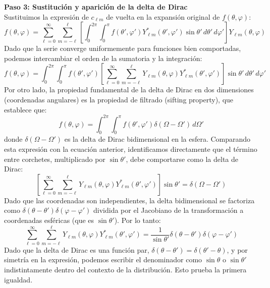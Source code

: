 \documentclass[a4paper]{article}
\begin{document}
\vspace{0.3cm}
\noindent\textbf{Paso 3: Sustitución y aparición de la delta de Dirac} \\
Sustituimos la expresión de $c_{\ell m}$ de vuelta en la expansión original de $f(\theta, \varphi)$:
$$
f(\theta, \varphi) = \sum_{\ell=0}^{\infty} \sum_{m=-\ell}^{\ell} \left[ \int_{0}^{2\pi} \int_{0}^{\pi} f(\theta', \varphi') Y_{\ell m}^*(\theta', \varphi') \sin\theta' \, d\theta' \, d\varphi' \right] Y_{\ell m}(\theta, \varphi)
$$
Dado que la serie converge uniformemente para funciones bien comportadas, podemos intercambiar el orden de la sumatoria y la integración:
$$
f(\theta, \varphi) = \int_{0}^{2\pi} \int_{0}^{\pi} f(\theta', \varphi') \left[ \sum_{\ell=0}^{\infty} \sum_{m=-\ell}^{\ell} Y_{\ell m}(\theta, \varphi) Y_{\ell m}^*(\theta', \varphi') \right] \sin\theta' \, d\theta' \, d\varphi'
$$
Por otro lado, la propiedad fundamental de la delta de Dirac en dos dimensiones (coordenadas angulares) es la propiedad de filtrado (sifting property), que establece que:
$$
f(\theta, \varphi) = \int_{0}^{2\pi} \int_{0}^{\pi} f(\theta', \varphi') \delta(\Omega - \Omega') \, d\Omega'
$$
donde $\delta(\Omega - \Omega')$ es la delta de Dirac bidimensional en la esfera. Comparando esta expresión con la ecuación anterior, identificamos directamente que el término entre corchetes, multiplicado por $\sin\theta'$, debe comportarse como la delta de Dirac:
$$
\left[ \sum_{\ell=0}^{\infty} \sum_{m=-\ell}^{\ell} Y_{\ell m}(\theta, \varphi) Y_{\ell m}^*(\theta', \varphi') \right] \sin\theta' = \delta(\Omega - \Omega')
$$
Dado que las coordenadas son independientes, la delta bidimensional se factoriza como $\delta(\theta - \theta') \delta(\varphi - \varphi')$ dividida por el Jacobiano de la transformación a coordenadas esféricas (que es $\sin\theta'$). Por lo tanto:
$$
\sum_{\ell=0}^{\infty} \sum_{m=-\ell}^{\ell} Y_{\ell m}(\theta, \varphi) Y_{\ell m}^*(\theta', \varphi') = \frac{1}{\sin\theta'} \delta(\theta - \theta') \delta(\varphi - \varphi')
$$
Dado que la delta de Dirac es una función par, $\delta(\theta - \theta') = \delta(\theta' - \theta)$, y por simetría en la expresión, podemos escribir el denominador como $\sin\theta$ o $\sin\theta'$ indistintamente dentro del contexto de la distribución. Esto prueba la primera igualdad.
\end{document}
